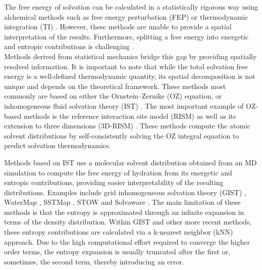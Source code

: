 \documentclass[9pt,tutorial,pubversion]{livecoms}
\begin{document}
The free energy of solvation can be calculated in a statistically rigorous way using alchemical methods \cite{Liu2016-md-solubility,Mobley2009-dgsolv,Mobley2014-freesolv} such as free energy perturbation (FEP) \cite{Zwanzig1954-reweighting} or thermodynamic integration (TI) \cite{Kirkwood1935-ti}.
However, these methods are unable to provide a spatial interpretation of the results.
Furthermore, splitting a free energy into energetic and entropic contributions is challenging \cite{Peter2004-alchemical-entropy}.\\
Methods derived from statistical mechanics bridge this gap by providing spatially resolved information. 
It is important to note that while the total solvation free energy is a well-defined thermodynamic quantity, its spatial decomposition is not unique and depends on the theoretical framework\cite{Persson02092022}.
These methods most commonly are based on either the Ornstein–Zernike (OZ) equation, or \cite{Hansen2013-simple-liquids} inhomogeneous fluid solvation theory (IST) \cite{Lazaridis1998}.
The most important example of OZ-based methods is the reference interaction site model (RISM) \cite{Chandler1972-rism} as well as its extension to three dimensions (3D-RISM) \cite{Kovalenko1998-3drism}.
These methods compute the atomic solvent distributions by self-consistently solving the OZ integral equation to predict solvation thermodynamics.

Methods based on IST use a molecular solvent distribution obtained from an MD simulation to compute the free energy of hydration from its energetic and entropic contributions, providing easier interpretability of the resulting distributions.
Examples include grid inhomogeneous solvation theory (GIST) \cite{Nguyen2012,Ramsey2016}, WaterMap \cite{Young2007-watermap,Abel2008-watermap}, SSTMap \cite{Haider2018-sstmap}, STOW \cite{Li2012-stow} and Solvaware \cite{Huggins2016-solvaware}.
The main limitation of these methods is that the entropy is approximated through an infinite expansion in terms of the density distribution. 
Within GIST and other more recent methods, these entropy contributions are calculated via a k-nearest neighbor (kNN) approach.  
Due to the high computational effort required to converge the higher order terms, the entropy expansion is usually truncated after the first or, sometimes, the second \cite{Nguyen2016-gist-second-order,Waibl2022-gist-solvents} term, thereby introducing an error.
\end{document}
